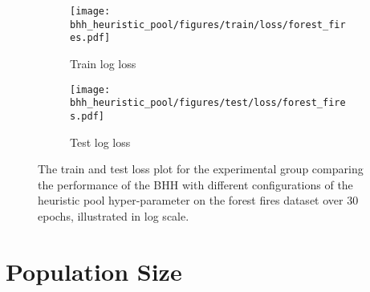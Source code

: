 \begin{figure}[htbp]
	\begin{subfigure}{0.5\textwidth}
		\centering
		\texttt{[image: bhh\_heuristic\_pool/figures/train/loss/forest\_fires.pdf]}
		\caption{Train log loss}
		\label{fig:results:heuristic_pool:figures:loss:train:forest_fires}
	\end{subfigure}
	\begin{subfigure}{0.5\textwidth}
		\centering
		\texttt{[image: bhh\_heuristic\_pool/figures/test/loss/forest\_fires.pdf]}
		\caption{Test log loss}
		\label{fig:results:heuristic_pool:figures:loss:test:forest_fires}
	\end{subfigure}
	\par\bigskip
	\caption{The train and test loss plot for the experimental group comparing the performance of the \acs{BHH} with different configurations of the heuristic pool hyper-parameter on the forest fires dataset over 30 epochs, illustrated in log scale.}
	\label{fig:results:heuristic_pool:figures:forest_fires}
\end{figure}



\section{Population Size}\label{sec:results:population}

